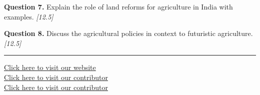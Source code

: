 \documentclass[11pt,a4paper]{article}
\newcommand{\pts}[1]{\hfill   \textit{[#1]}}
\begin{document}
\medskip


\noindent   \textbf{Question 7.} Explain the role of land reforms for agriculture in India with examples. \pts{12.5}

\medskip


\noindent   \textbf{Question 8.} Discuss the agricultural policies in context to futuristic agriculture. \pts{12.5}

\vfill\rule{\linewidth}{0.4pt}

\begin{center}\small
\href{https://bhu-exam.vercel.app/}{Click here to visit our website}\\[4pt]
\href{https://me-aryan.vercel.app/}{Click here to visit our contributor}\\[4pt]
\href{https://quashan-me.vercel.app/}{Click here to visit our contributor}
\end{center}
\end{document}
